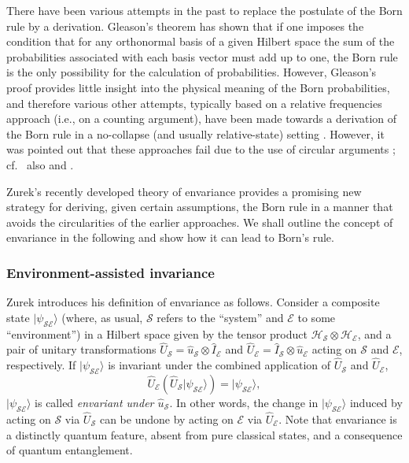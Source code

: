 \documentclass[rmp,aps,amsmath,amsfonts,noshowkeys,noshowpacs,12pt]{revtex4}
\newcommand{\cf}{cf.\ }
\newcommand{\ket}[1]{\ensuremath{|{#1\rangle}}}
\begin{document}
There have been various attempts in the past to replace the postulate
of the Born rule by a derivation. Gleason's
\citeyearpar{Gleason:1957:zp} theorem has shown that if one imposes
the condition that for any orthonormal basis of a given Hilbert space
the sum of the probabilities associated with each basis vector must
add up to one, the Born rule is the only possibility for the
calculation of probabilities. However, Gleason's proof provides little
insight into the physical meaning of the Born probabilities,
and therefore various other attempts, typically based on a relative
frequencies approach (i.e., on a counting argument), have been made
towards a derivation of the Born rule in a no-collapse (and usually
relative-state) setting \citep[see, for
example,][]{Everett:1957:rw,DeWitt:1973:pz,Hartle:1968:gg,DeWitt:1971:pz,%
  Graham:1973:ww,Geroch:1984:yt,Farhi:1989:uh,Deutsch:1999:tz}.
However, it was pointed out that these approaches fail due to the use
of circular arguments
\citep{Stein:1984:uu,Kent:1990:nm,Squires:1990:lz,Barnum:2000:oz}; \cf
also \citet{Wallace:2003:zr} and \citet{Saunders:2002:tz}.

Zurek's recently developed theory of envariance provides a promising
new strategy for deriving, given certain assumptions, the Born rule in
a manner that avoids the circularities of the earlier approaches.  We
shall outline the concept of envariance in the following and show how
it can lead to Born's rule.


\subsubsection{Environment-assisted invariance}

Zurek introduces his definition of envariance as follows. Consider a
composite state $\ket{\psi_\mathcal{SE}}$ (where, as usual,
$\mathcal{S}$ refers to the ``system'' and $\mathcal{E}$ to some
``environment'') in a Hilbert space given by the tensor product
$\mathcal{H}_\mathcal{S} \otimes \mathcal{H}_\mathcal{E}$, and a pair
of unitary transformations $\widehat{U}_\mathcal{S} =
\widehat{u}_\mathcal{S} \otimes \widehat{I}_\mathcal{E}$ and
$\widehat{U}_\mathcal{E} = \widehat{I}_\mathcal{S} \otimes
\widehat{u}_\mathcal{E}$ acting on $\mathcal{S}$ and $\mathcal{E}$,
respectively.  If $\ket{\psi_\mathcal{SE}}$ is invariant under the
combined application of $\widehat{U}_\mathcal{S}$ and
$\widehat{U}_\mathcal{E}$,
%
\begin{equation} \label{eq:envar}
\widehat{U}_\mathcal{E} (\widehat{U}_\mathcal{S} 
\ket{\psi_\mathcal{SE}}) = \ket{\psi_\mathcal{SE}},
\end{equation}
%
$\ket{\psi_\mathcal{SE}}$ is called \emph{envariant under
  $\widehat{u}_\mathcal{S}$}. In other words, the change in
$\ket{\psi_\mathcal{SE}}$ induced by acting on $\mathcal{S}$ via
$\widehat{U}_\mathcal{S}$ can be undone by acting on $\mathcal{E}$ via
$\widehat{U}_\mathcal{E}$.  Note that envariance is a distinctly
quantum feature, absent from pure classical states, and a consequence
of quantum entanglement.
\end{document}
